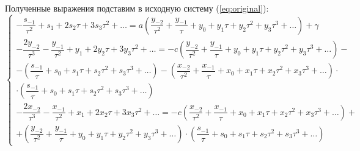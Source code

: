 Полученные выражения подставим в исходную систему (\ref{eq:original}):
\begin{equation*}
  \label{eq:step4}
  \left\{
    \begin{aligned}
      -\dfrac{s_{-1}}{\tau^{2}} + s_1 + 2s_2\tau + 3s_3\tau^2 + \ldots = a \left( \dfrac{y_{-2}}{\tau^2} + \dfrac{y_{-1}}{\tau} + y_0 + y_1\tau + y_2\tau^2 + y_3\tau^3 + \ldots \right) + \gamma \\			
      -\dfrac{2y_{-2}}{\tau^{3}} - \dfrac{y_{-1}}{\tau^2} + y_1 + 2y_2\tau + 3y_3\tau^2 + \ldots = -c \left( \dfrac{y_{-2}}{\tau^2} + \dfrac{y_{-1}}{\tau} + y_0 + y_1\tau + y_2\tau^2 + y_3\tau^3 + \ldots \right) - \\ - \left( \dfrac{s_{-1}}{\tau} + s_0 + s_1\tau + s_2\tau^2 + s_3\tau^3 + \ldots \right) - \left( \dfrac{x_{-2}}{\tau^2} + \dfrac{x_{-1}}{\tau} + x_0 + x_1\tau + x_2\tau^2 + x_3\tau^3 + \ldots \right) \cdot \\ \cdot \left( \dfrac{s_{-1}}{\tau} + s_0 + s_1\tau + s_2\tau^2 + s_3\tau^3 + \ldots \right) \\	
      -\dfrac{2x_{-2}}{\tau^{3}} - \dfrac{x_{-1}}{\tau^2} + x_1 + 2x_2\tau + 3x_3\tau^2 + \ldots = -c \left( \dfrac{x_{-2}}{\tau^2} + \dfrac{x_{-1}}{\tau} + x_0 + x_1\tau + x_2\tau^2 + x_3\tau^3 + \ldots \right) + \\ + \left( \dfrac{y_{-2}}{\tau^2} + \dfrac{y_{-1}}{\tau} + y_0 + y_1\tau + y_2\tau^2 + y_3\tau^3 + \ldots \right) \cdot \left( \dfrac{s_{-1}}{\tau} + s_0 + s_1\tau + s_2\tau^2 + s_3\tau^3 + \ldots \right)
    \end{aligned}
  \right.
\end{equation*}

\pagebreak 

